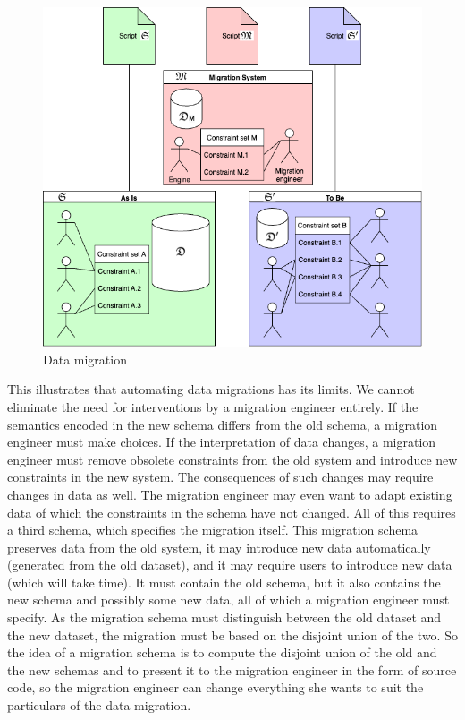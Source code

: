 \documentclass{elsarticle}
\begin{document}
\begin{figure}[bht]
   \begin{center}
     \includegraphics[scale=.35]{Migration.png}
   \end{center}
\caption{Data migration}
\label{fig:event flow}
\end{figure}
   This illustrates that automating data migrations has its limits.
   We cannot eliminate the need for interventions by a migration engineer entirely.
   If the semantics encoded in the new schema differs from the old schema,
   a migration engineer must make choices.
   If the interpretation of data changes,
   a migration engineer must remove obsolete constraints from the old system and introduce new constraints in the new system.
   The consequences of such changes may require changes in data as well.
   The migration engineer may even want to adapt existing data of which the constraints in the schema have not changed.
   All of this requires a third schema, which specifies the migration itself.
   This migration schema preserves data from the old system, it may introduce new data automatically (generated from the old dataset),
   and it may require users to introduce new data (which will take time). 
   It must contain the old schema, but it also contains the new schema and possibly some new data, all of which a migration engineer must specify.
   As the migration schema must distinguish between the old dataset and the new dataset,
   the migration must be based on the disjoint union of the two.
   So the idea of a migration schema is to compute the disjoint union of the old and the new schemas
   and to present it to the migration engineer in the form of source code,
   so the migration engineer can change everything she wants to suit the particulars of the data migration.
\end{document}
